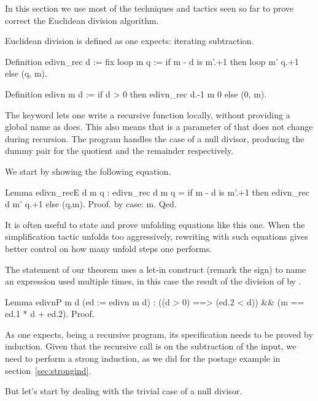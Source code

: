 In this section we use most
of the techniques and tactics seen so far to prove correct the
Euclidean division algorithm.

Euclidean division is defined as one expects: iterating subtraction.

\begin{coq}{}{}
Definition edivn_rec d :=
  fix loop m q := if m - d is m'.+1 then loop m' q.+1 else (q, m).

Definition edivn m d := if d > 0 then edivn_rec d.-1 m 0 else (0, m).
\end{coq}

The  keyword lets one write a recursive function locally, without
providing a global name as  does.  This also means that 
is a parameter of  that does not change during recursion.
The  program handles the case of a null divisor, producing
the dummy pair  for the quotient and the remainder respectively.

We start by showing the following equation.

\begin{coq}{}{}
Lemma edivn_recE d m q :
 edivn_rec d m q = if m - d is m'.+1 then edivn_rec d m' q.+1 else (q,m).
Proof. by case: m. Qed.
\end{coq}
It is often useful to state and prove unfolding equations like this one.
When the simplification tactic \C{/=} unfolds too aggressively,
rewriting with such equations gives better control on how many
unfold steps one performs.

The statement of our theorem
uses a let-in construct (remark the \C{:=} sign)
to name an expression used multiple
times, in this case the result of the division of  by .

\begin{coq}{}{}
Lemma edivnP m d (ed := edivn m d) :
  ((d > 0) ==> (ed.2 < d)) && (m == ed.1 * d + ed.2).
Proof.
\end{coq}

As one expects,  being a recursive program, its specification
needs to be proved by induction.  Given that the recursive call is on
the subtraction of the input, we need to perform a strong induction,
as we did for the postage example in section~\ref{sec:strongind}.

But let's start by dealing with the trivial case of a null divisor.

